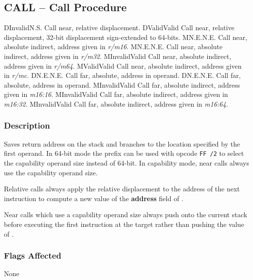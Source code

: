 \clearpage
{}
{}
\subsection*{CALL -- Call Procedure}

\begin{x86opcodetable}
  {D}{Invalid}{N.S.}
  {Call near, relative displacement.}
  {D}{Valid}{Valid}
  {Call near, relative displacement, 32-bit displacement sign-extended
    to 64-bits.}
  {M}{N.E.}{N.E.}
  {Call near, absolute indirect, address given in \emph{r/m16}.}
  {M}{N.E.}{N.E.}
  {Call near, absolute indirect, address given in \emph{r/m32}.}
  {M}{Invalid}{Valid}
  {Call near, absolute indirect, address given in \emph{r/m64}.}
  {M}{Valid}{Valid}
  {Call near, absolute indirect, address given in \emph{r/mc}.}
  {D}{N.E.}{N.E.}
  {Call far, absolute, address in operand.}
  {D}{N.E.}{N.E.}
  {Call far, absolute, address in operand.}
  {M}{Invalid}{Valid}
  {Call far, absolute indirect, address given in \emph{m16:16}.}
  {M}{Invalid}{Valid}
  {Call far, absolute indirect, address given in \emph{m16:32}.}
  {M}{Invalid}{Valid}
  {Call far, absolute indirect, address given in \emph{m16:64}.}
\end{x86opcodetable}

\begin{x86opentable}
\end{x86opentable}

\subsubsection*{Description}

Saves return address on the stack and branches to the location
specified by the first operand.  In 64-bit mode the 
prefix can be used with opcode \texttt{FF /2} to select the capability
operand size instead of 64-bit.  In capability mode, near calls always
use the capability operand size.

Relative calls always apply the relative displacement to the address
of the next instruction to compute a new value of the \textbf{address}
field of \CIP{}.

Near calls which use a capability operand size always push \CIP{} onto
the current stack before executing the first instruction at the target
rather than pushing the value of \RIP{}.

\subsubsection*{Flags Affected}

None

